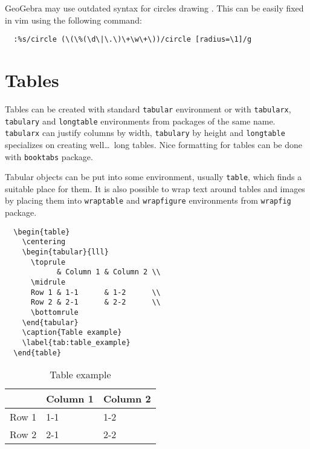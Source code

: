 GeoGebra may use outdated syntax for circles drawing \autocite{Aalberto-2020}.
This can be easily fixed in vim using the following command:
\begin{verbatim}
  :%s/circle (\(\%(\d\|\.\)\+\w\+\))/circle [radius=\1]/g
\end{verbatim}

\section{Tables}
Tables can be created with standard \texttt{tabular} environment or with \texttt{tabularx}, \texttt{tabulary} and \texttt{longtable} environments from packages of the same name.
\texttt{tabularx} can justify columns by width, \texttt{tabulary} by height and \texttt{longtable} specializes on creating well\dots\ long tables.
Nice formatting for tables can be done with \texttt{booktabs} package.

Tabular objects can be put into some environment, usually \texttt{table}, which finds a suitable place for them.
It is also possible to wrap text around tables and images by placing them into \texttt{wraptable} and \texttt{wrapfigure} environments from \texttt{wrapfig} package.

\begin{verbatim}
  \begin{table}
    \centering
    \begin{tabular}{lll}
      \toprule
            & Column 1 & Column 2 \\
      \midrule
      Row 1 & 1-1      & 1-2      \\
      Row 2 & 2-1      & 2-2      \\
      \bottomrule
    \end{tabular}
    \caption{Table example}
    \label{tab:table_example}
  \end{table}
\end{verbatim}

\begin{table}[h!]
  \centering
  \begin{tabular}{lll}
    \toprule
          & Column 1 & Column 2 \\
    \midrule
    Row 1 & 1-1      & 1-2      \\
    Row 2 & 2-1      & 2-2      \\
    \bottomrule
  \end{tabular}
  \caption{Table example}
  \label{tab:table_example}
\end{table}

